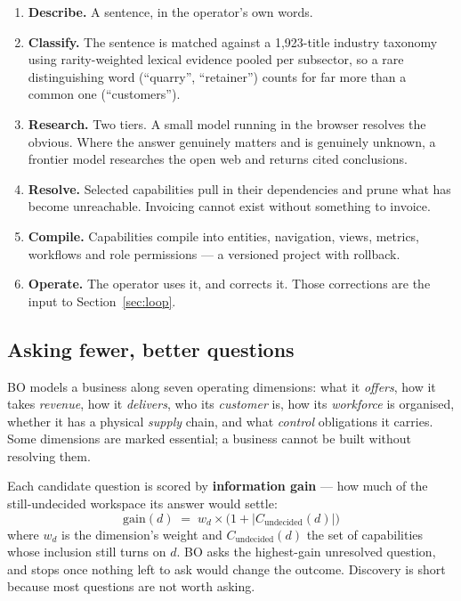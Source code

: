 \documentclass[11pt,a4paper]{article}
\newcommand{\term}[1]{\textcolor{boaccent}{\textbf{#1}}}
\begin{document}
\begin{enumerate}[leftmargin=1.6em,itemsep=3pt]
  \item \textbf{Describe.} A sentence, in the operator's own words.
  \item \textbf{Classify.} The sentence is matched against a 1{,}923-title industry taxonomy using
        rarity-weighted lexical evidence pooled per subsector, so a rare distinguishing word
        (``quarry'', ``retainer'') counts for far more than a common one (``customers'').
  \item \textbf{Research.} Two tiers. A small model running in the browser resolves the obvious.
        Where the answer genuinely matters and is genuinely unknown, a frontier model researches the
        open web and returns cited conclusions.
  \item \textbf{Resolve.} Selected capabilities pull in their dependencies and prune what has become
        unreachable. Invoicing cannot exist without something to invoice.
  \item \textbf{Compile.} Capabilities compile into entities, navigation, views, metrics, workflows
        and role permissions --- a versioned project with rollback.
  \item \textbf{Operate.} The operator uses it, and corrects it. Those corrections are the input to
        Section~\ref{sec:loop}.
\end{enumerate}

\subsection{Asking fewer, better questions}

BO models a business along seven operating dimensions: what it \emph{offers}, how it takes
\emph{revenue}, how it \emph{delivers}, who its \emph{customer} is, how its \emph{workforce} is
organised, whether it has a physical \emph{supply} chain, and what \emph{control} obligations it
carries. Some dimensions are marked essential; a business cannot be built without resolving them.

Each candidate question is scored by \term{information gain} --- how much of the still-undecided
workspace its answer would settle:
\[
  \mathrm{gain}(d) \;=\; w_d \times \bigl(1 + \lvert C_{\text{undecided}}(d)\rvert\bigr)
\]
where $w_d$ is the dimension's weight and $C_{\text{undecided}}(d)$ the set of capabilities whose
inclusion still turns on $d$. BO asks the highest-gain unresolved question, and stops once nothing
left to ask would change the outcome. Discovery is short because most questions are not worth
asking.
\end{document}
